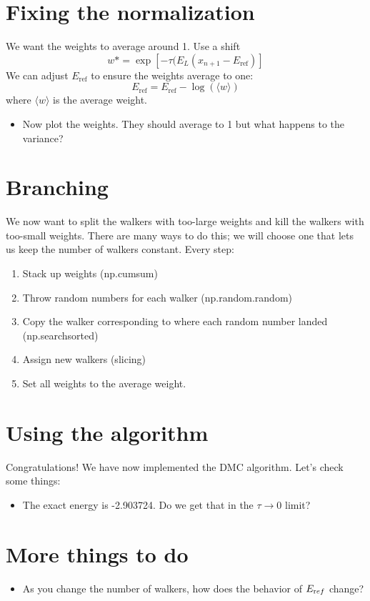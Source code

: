 \documentclass[12pt]{article}
\begin{document}
\section{Fixing the normalization}

We want the weights to average around 1.
Use a shift 
\begin{equation}
w*=	\exp[-\tau (E_L(x_{n+1}-E_{\text{ref}})] 
\end{equation}
We can adjust $E_{\text {ref}}$ to ensure the weights average to one:
\begin{equation}
E_{\text{ref}}=E_{\text{ref}}-\log(\langle w \rangle) 
\end{equation}
where $\langle w \rangle$ is the average weight. 

\begin{itemize}
\item Now plot the weights. They should average to 1 but what happens to the variance?
\end{itemize}

\section{Branching} 

We now want to split the walkers with too-large weights and kill the walkers with too-small weights. 
There are many ways to do this; we will choose one that lets us keep the number of walkers constant. 
Every step:
\begin{enumerate}
\item Stack up weights (np.cumsum)
\item Throw random numbers for each walker (np.random.random)
\item Copy the walker corresponding to where each random number landed (np.searchsorted)
\item Assign new walkers (slicing)
\item Set all weights to the average weight.
\end{enumerate}
\section{Using the algorithm}
Congratulations! We have now implemented the DMC algorithm. 
Let's check some things:

\begin{itemize}
\item The exact energy is -2.903724. Do we get that in the $\tau\rightarrow0$ limit?
\end{itemize}

\section{More things to do}
\begin{itemize}
\item As you change the number of walkers, how does the behavior of $E_{\text ref}$ change?
\end{itemize}
\end{document}
